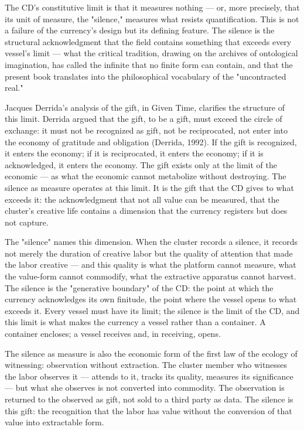 The CD's constitutive limit is that it measures nothing — or, more precisely, that its unit of measure, the "silence," measures what resists quantification. This is not a failure of the currency's design but its defining feature. The silence is the structural acknowledgment that the field contains something that exceeds every vessel's limit — what the critical tradition, drawing on the archives of ontological imagination, has called the infinite that no finite form can contain, and that the present book translates into the philosophical vocabulary of the "uncontracted real."

Jacques Derrida's analysis of the gift, in Given Time, clarifies the structure of this limit. Derrida argued that the gift, to be a gift, must exceed the circle of exchange: it must not be recognized as gift, not be reciprocated, not enter into the economy of gratitude and obligation (Derrida, 1992). If the gift is recognized, it enters the economy; if it is reciprocated, it enters the economy; if it is acknowledged, it enters the economy. The gift exists only at the limit of the economic — as what the economic cannot metabolize without destroying. The silence as measure operates at this limit. It is the gift that the CD gives to what exceeds it: the acknowledgment that not all value can be measured, that the cluster's creative life contains a dimension that the currency registers but does not capture.

The "silence" names this dimension. When the cluster records a silence, it records not merely the duration of creative labor but the quality of attention that made the labor creative — and this quality is what the platform cannot measure, what the value-form cannot commodify, what the extractive apparatus cannot harvest. The silence is the "generative boundary" of the CD: the point at which the currency acknowledges its own finitude, the point where the vessel opens to what exceeds it. Every vessel must have its limit; the silence is the limit of the CD, and this limit is what makes the currency a vessel rather than a container. A container encloses; a vessel receives and, in receiving, opens.

The silence as measure is also the economic form of the first law of the ecology of witnessing: observation without extraction. The cluster member who witnesses the labor observes it — attends to it, tracks its quality, measures its significance — but what she observes is not converted into commodity. The observation is returned to the observed as gift, not sold to a third party as data. The silence is this gift: the recognition that the labor has value without the conversion of that value into extractable form.

